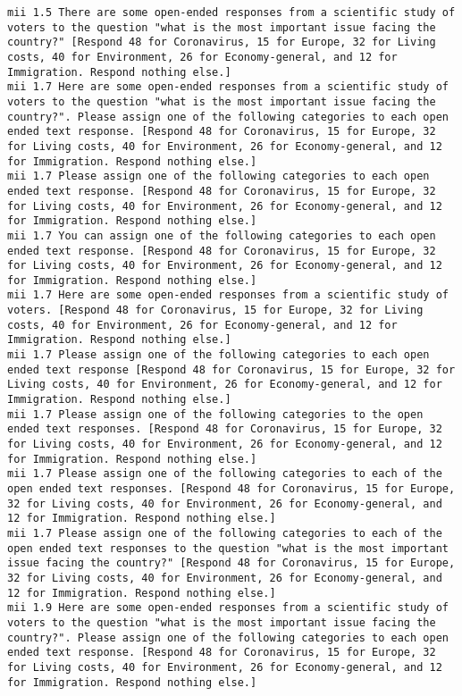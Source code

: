\begin{lstlisting}[label=lst:promptvariants]
mii	1.5	There are some open-ended responses from a scientific study of voters to the question "what is the most important issue facing the country?" [Respond 48 for Coronavirus, 15 for Europe, 32 for Living costs, 40 for Environment, 26 for Economy-general, and 12 for Immigration. Respond nothing else.]
mii	1.7	Here are some open-ended responses from a scientific study of voters to the question "what is the most important issue facing the country?". Please assign one of the following categories to each open ended text response. [Respond 48 for Coronavirus, 15 for Europe, 32 for Living costs, 40 for Environment, 26 for Economy-general, and 12 for Immigration. Respond nothing else.]
mii	1.7	Please assign one of the following categories to each open ended text response. [Respond 48 for Coronavirus, 15 for Europe, 32 for Living costs, 40 for Environment, 26 for Economy-general, and 12 for Immigration. Respond nothing else.]
mii	1.7	You can assign one of the following categories to each open ended text response. [Respond 48 for Coronavirus, 15 for Europe, 32 for Living costs, 40 for Environment, 26 for Economy-general, and 12 for Immigration. Respond nothing else.]
mii	1.7	Here are some open-ended responses from a scientific study of voters. [Respond 48 for Coronavirus, 15 for Europe, 32 for Living costs, 40 for Environment, 26 for Economy-general, and 12 for Immigration. Respond nothing else.]
mii	1.7	Please assign one of the following categories to each open ended text response [Respond 48 for Coronavirus, 15 for Europe, 32 for Living costs, 40 for Environment, 26 for Economy-general, and 12 for Immigration. Respond nothing else.]
mii	1.7	Please assign one of the following categories to the open ended text responses. [Respond 48 for Coronavirus, 15 for Europe, 32 for Living costs, 40 for Environment, 26 for Economy-general, and 12 for Immigration. Respond nothing else.]
mii	1.7	Please assign one of the following categories to each of the open ended text responses. [Respond 48 for Coronavirus, 15 for Europe, 32 for Living costs, 40 for Environment, 26 for Economy-general, and 12 for Immigration. Respond nothing else.]
mii	1.7	Please assign one of the following categories to each of the open ended text responses to the question "what is the most important issue facing the country?" [Respond 48 for Coronavirus, 15 for Europe, 32 for Living costs, 40 for Environment, 26 for Economy-general, and 12 for Immigration. Respond nothing else.]
mii	1.9	Here are some open-ended responses from a scientific study of voters to the question "what is the most important issue facing the country?". Please assign one of the following categories to each open ended text response. [Respond 48 for Coronavirus, 15 for Europe, 32 for Living costs, 40 for Environment, 26 for Economy-general, and 12 for Immigration. Respond nothing else.]

\end{lstlisting}
